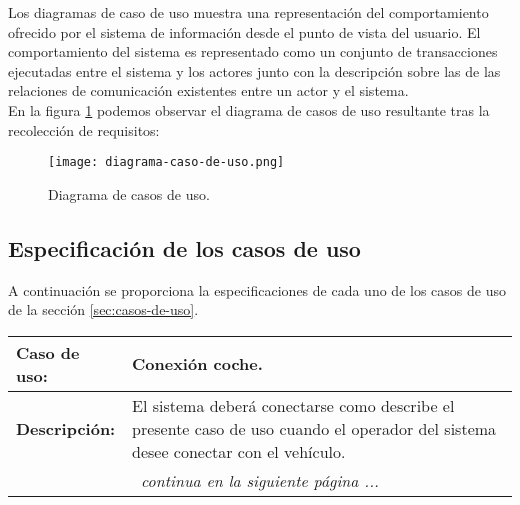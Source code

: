 Los diagramas de caso de uso muestra una representación del comportamiento ofrecido por el sistema de información desde el punto de vista del usuario. El comportamiento del sistema es representado como un conjunto de transacciones ejecutadas entre el sistema y los actores junto con la descripción sobre las de las relaciones de comunicación existentes entre un actor y el sistema.\\

En la figura \ref{caso-de-uso} podemos observar el diagrama de casos de uso resultante tras la recolección de requisitos:\\

\begin{figure}[H]
  \begin{center}
    \texttt{[image: diagrama-caso-de-uso.png]}
  \end{center}
  \caption{Diagrama de casos de uso.}
  \label{caso-de-uso}
\end{figure}

\subsection{Especificación de los casos de uso}

A continuación se proporciona la especificaciones de cada uno de los casos de uso de la sección \ref{sec:casos-de-uso}.\\

\begin{table}[H]
  \begin{center}
    \begin{tabular}{|p{3.5cm}|p{10cm}|}
      \hline
      {\textbf{Caso de uso:}} & { Conexión coche.} \\
      \hline
      {\textbf{Descripción:}} & {El sistema deberá conectarse como describe el presente caso de uso cuando el operador del sistema desee conectar con el vehículo.} \\
     \hline
     \multicolumn{2}{c}{\emph{continua en la siguiente página ...}}\\
    \end{tabular}
  \end{center}
\end{table}    

